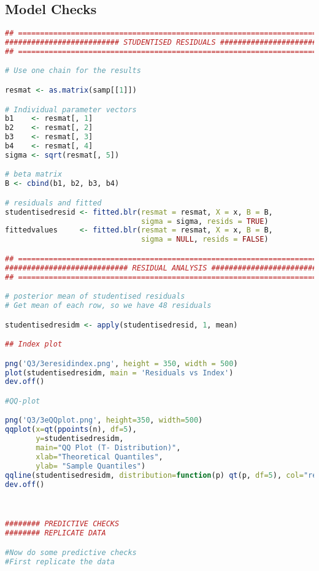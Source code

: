 \documentclass{article}
\begin{document}
\subsection{Model Checks} \label{App3:Model Checks}
\begin{lstlisting}[language=R]
## ===========================================================================##
########################## STUDENTISED RESIDUALS ###############################
## ===========================================================================##

# Use one chain for the results

resmat <- as.matrix(samp[[1]])

# Individual parameter vectors
b1    <- resmat[, 1]
b2    <- resmat[, 2]
b3    <- resmat[, 3]
b4    <- resmat[, 4]
sigma <- sqrt(resmat[, 5])

# beta matrix
B <- cbind(b1, b2, b3, b4)

# residuals and fitted
studentisedresid <- fitted.blr(resmat = resmat, X = x, B = B, 
                               sigma = sigma, resids = TRUE)
fittedvalues     <- fitted.blr(resmat = resmat, X = x, B = B, 
                               sigma = NULL, resids = FALSE)

## ===========================================================================##
############################ RESIDUAL ANALYSIS #################################
## ===========================================================================##

# posterior mean of studentised residuals
# Get mean of each row, so we have 48 residuals

studentisedresidm <- apply(studentisedresid, 1, mean)

## Index plot

png('Q3/3eresidindex.png', height = 350, width = 500)
plot(studentisedresidm, main = 'Residuals vs Index')
dev.off()

#QQ-plot

png('Q3/3eQQplot.png', height=350, width=500)
qqplot(x=qt(ppoints(n), df=5), 
       y=studentisedresidm, 
       main="QQ Plot (T- Distribution)",
       xlab="Theoretical Quantiles", 
       ylab= "Sample Quantiles")
qqline(studentisedresidm, distribution=function(p) qt(p, df=5), col="red", lw=2)
dev.off()



######## PREDICTIVE CHECKS
######## REPLICATE DATA

#Now do some predictive checks
#First replicate the data



\end{lstlisting}
\end{document}
